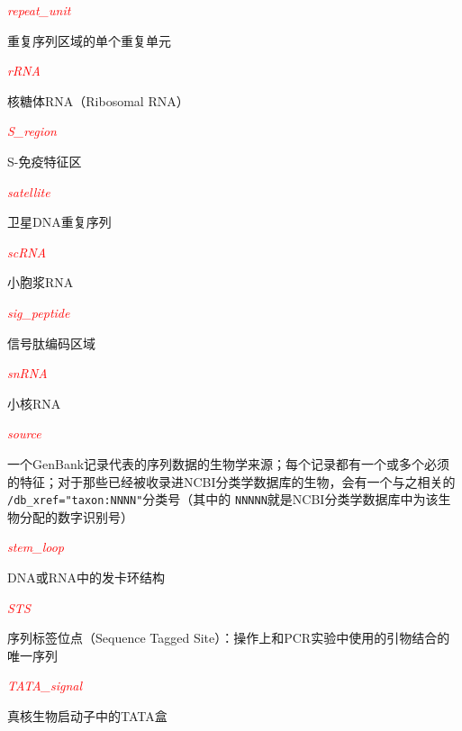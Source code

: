 \textcolor{red}{\textit{repeat\_unit}}
\begin{adjustwidth}{4em}{}
重复序列区域的单个重复单元
\end{adjustwidth}

\textcolor{red}{\textit{rRNA}}
\begin{adjustwidth}{4em}{}
核糖体RNA（Ribosomal RNA）
\end{adjustwidth}

\textcolor{red}{\textit{S\_region}}
\begin{adjustwidth}{4em}{}
S-免疫特征区
\end{adjustwidth}

\textcolor{red}{\textit{satellite}}
\begin{adjustwidth}{4em}{}
卫星DNA重复序列
\end{adjustwidth}

\textcolor{red}{\textit{scRNA}}
\begin{adjustwidth}{4em}{}
小胞浆RNA
\end{adjustwidth}

\textcolor{red}{\textit{sig\_peptide}}
\begin{adjustwidth}{4em}{}
信号肽编码区域
\end{adjustwidth}

\textcolor{red}{\textit{snRNA}}
\begin{adjustwidth}{4em}{}
小核RNA
\end{adjustwidth}

\textcolor{red}{\textit{source}}
\begin{adjustwidth}{4em}{}
一个GenBank记录代表的序列数据的生物学来源；每个记录都有一个或多个必须的特征；对于那些已经被收录进NCBI分类学数据库的生物，会有一个与之相关的 \verb|/db_xref="taxon:NNNN"|分类号（其中的 \verb|NNNNN|就是NCBI分类学数据库中为该生物分配的数字识别号）
\end{adjustwidth}

\textcolor{red}{\textit{stem\_loop}}
\begin{adjustwidth}{4em}{}
DNA或RNA中的发卡环结构
\end{adjustwidth}

\textcolor{red}{\textit{STS}}
\begin{adjustwidth}{4em}{}
序列标签位点（Sequence Tagged Site）：操作上和PCR实验中使用的引物结合的唯一序列
\end{adjustwidth}

\textcolor{red}{\textit{TATA\_signal}}
\begin{adjustwidth}{4em}{}
真核生物启动子中的TATA盒
\end{adjustwidth}

